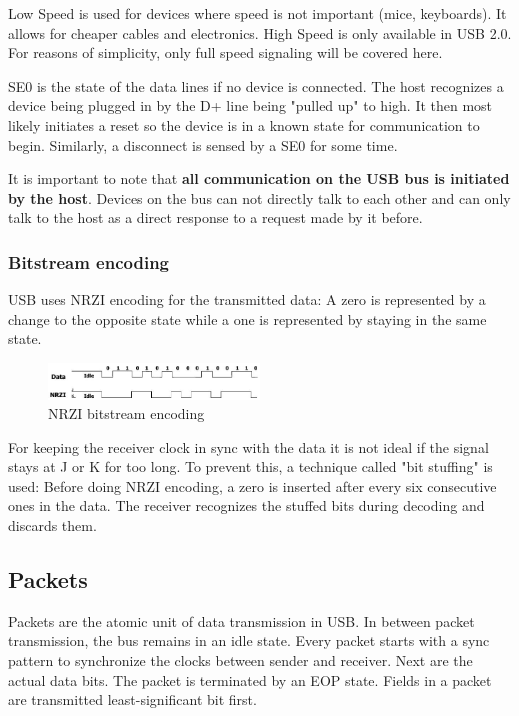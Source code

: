 \documentclass{article}
\begin{document}
\pagebreak
Low Speed is used for devices where speed is not important (mice, keyboards).
It allows for cheaper cables and electronics. High Speed is only available
in USB 2.0. For reasons of simplicity, only full speed signaling will be covered
here. \cite[p. 12]{usbstd}

SE0 is the state of the data lines if no device is connected. The host
recognizes a device being plugged in by the D+ line being "pulled up" to high.
It then most likely initiates a reset so the device is in a known state for
communication to begin. Similarly, a disconnect is sensed by a SE0 for some time.
\cite[p. 149]{usbstd}

It is important to note that {\bf all communication on the USB bus is initiated by the
host}. Devices on the bus can not directly talk to each other and can only talk
to the host as a direct response to a request made by it before.
\cite[p. 27]{usbstd}

\subsubsection{Bitstream encoding}

USB uses NRZI encoding for the transmitted data: A zero is represented by a change to
the opposite state while a one is represented by staying in the same state.

\begin{figure}[!htbp]
  \caption{NRZI bitstream encoding \cite[p. 157]{usbstd}}
  \centering
  \includegraphics[width=0.5\textwidth]{images/nrzi_encoding.jpg}
\end{figure}

For keeping the receiver clock in sync with the data it is not ideal if the signal
stays at J or K for too long. To prevent this, a technique called "bit stuffing"
is used: Before doing NRZI encoding, a zero is inserted after every six consecutive ones
in the data. The receiver recognizes the stuffed bits during decoding and discards them.
\cite[p. 157]{usbstd}

\subsection {Packets}

Packets are the atomic unit of data transmission in USB. In between packet transmission,
the bus remains in an idle state. Every packet starts with a sync pattern to synchronize
the clocks between sender and receiver. Next are the actual data bits. The packet is
terminated by an EOP state. Fields in a packet are transmitted least-significant
bit first. \cite[p. 195]{usbstd}
\end{document}

